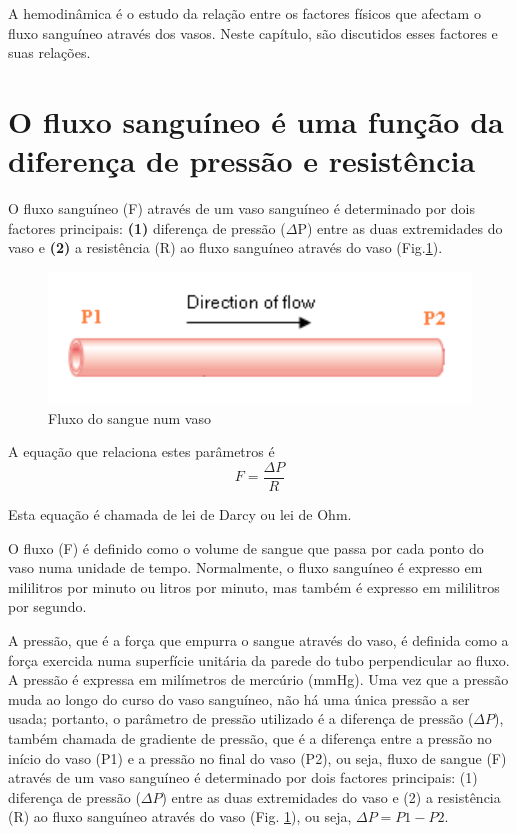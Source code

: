 \documentclass[
  portuguese,
  ]{book}
\begin{document}
A hemodinâmica é o estudo da relação entre os factores físicos que afectam o fluxo sanguíneo através dos vasos. Neste capítulo, são discutidos esses factores e suas relações.

\hypertarget{o-fluxo-sanguuxedneo-uxe9-uma-funuxe7uxe3o-da-diferenuxe7a-de-pressuxe3o-e-resistuxeancia}{%
\section{O fluxo sanguíneo é uma função da diferença de pressão e resistência}\label{o-fluxo-sanguuxedneo-uxe9-uma-funuxe7uxe3o-da-diferenuxe7a-de-pressuxe3o-e-resistuxeancia}}

O fluxo sanguíneo (F) através de um vaso sanguíneo é determinado por dois factores principais: \textbf{(1)} diferença de pressão (\(\Delta\)P) entre as duas extremidades do vaso e \textbf{(2)} a resistência (R) ao fluxo sanguíneo através do vaso (Fig.\ref{fig:imghemo1}).

\begin{figure}

{\centering \includegraphics[width=0.5\linewidth]{img/hemo_1} 

}

\caption{Fluxo do sangue num vaso}\label{fig:imghemo1}
\end{figure}

A equação que relaciona estes parâmetros é
\begin{equation}
F=\frac{\Delta P}{R}
\label{eq:darcy}
\end{equation}

Esta equação é chamada de lei de Darcy ou lei de Ohm.

O fluxo (F) é definido como o volume de sangue que passa por cada ponto do vaso numa unidade de tempo. Normalmente, o fluxo sanguíneo é expresso em mililitros por minuto ou litros por minuto, mas também é expresso em mililitros por segundo.

A pressão, que é a força que empurra o sangue através do vaso, é definida como a força exercida numa superfície unitária da parede do tubo perpendicular ao fluxo. A pressão é expressa em milímetros de mercúrio (mmHg). Uma vez que a pressão muda ao longo do curso do vaso sanguíneo, não há uma única pressão a ser usada; portanto, o parâmetro de pressão utilizado é a diferença de pressão (\(\Delta P\)), também chamada de gradiente de pressão, que é a diferença entre a pressão no início do vaso (P1) e a pressão no final do vaso (P2), ou seja, fluxo de sangue (F) através de um vaso sanguíneo é determinado por dois factores principais: (1) diferença de pressão (\(\Delta P\)) entre as duas extremidades do vaso e (2) a resistência (R) ao fluxo sanguíneo através do vaso (Fig. \ref{fig:imghemo1}), ou seja, \(\Delta P = P1 - P2\).
\end{document}
